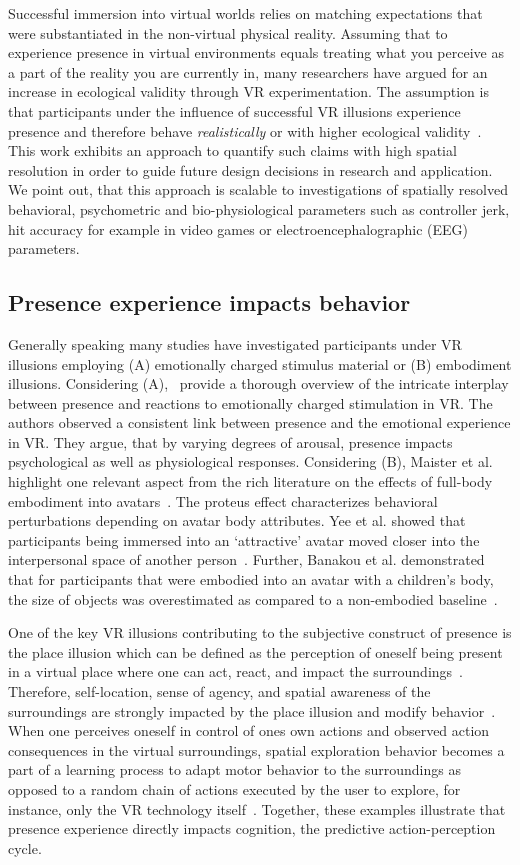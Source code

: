Successful immersion into virtual worlds relies on matching expectations that were substantiated in the non-virtual physical reality. Assuming that to experience presence in virtual environments equals treating what you perceive as a part of the reality you are currently in, many researchers have argued for an increase in ecological validity through VR experimentation. The assumption is that participants under the influence of successful VR illusions experience presence and therefore behave \textit{realistically} or with higher ecological validity~\cite{Tarr2002, Bohil2011, Parsons2015, Parsons2017}. This work exhibits an approach to quantify such claims with high spatial resolution in order to guide future design decisions in research and application. We point out, that this approach is scalable to investigations of spatially resolved behavioral, psychometric and bio-physiological parameters such as controller jerk, hit accuracy for example in video games or electroencephalographic (EEG) parameters.

\subsection{Presence experience impacts behavior}
Generally speaking many studies have investigated participants under VR illusions employing (A) emotionally charged stimulus material or (B) embodiment illusions. Considering (A),~\cite{Diemer2015} provide a thorough overview of the intricate interplay between presence and reactions to emotionally charged stimulation in VR. The authors observed a consistent link between presence and the emotional experience in VR. They argue, that by varying degrees of arousal, presence impacts psychological as well as physiological responses. Considering (B), Maister et al. highlight one relevant aspect from the rich literature on the effects of full-body embodiment into avatars~\cite{Maister2015}. The proteus effect characterizes behavioral perturbations depending on avatar body attributes. Yee et al. showed that participants being immersed into an `attractive' avatar moved closer into the interpersonal space of another person~\cite{Yee2007}. Further, Banakou et al. demonstrated that for participants that were embodied into an avatar with a children's body, the size of objects was overestimated as compared to a non-embodied baseline~\cite{Banakou2013}.

One of the key VR illusions contributing to the subjective construct of presence is the place illusion which can be defined as the perception of oneself being present in a virtual place where one can act, react, and impact the surroundings~\cite{Slater2009}. Therefore, self-location, sense of agency, and spatial awareness of the surroundings are strongly impacted by the place illusion and modify behavior~\cite{Kilteni2012}. When one perceives oneself in control of ones own actions and observed action consequences in the virtual surroundings, spatial exploration behavior becomes a part of a learning process to adapt motor behavior to the surroundings as opposed to a random chain of actions executed by the user to explore, for instance, only the VR technology itself~\cite{Tan2011}. Together, these examples illustrate that presence experience directly impacts cognition, the predictive action-perception cycle.